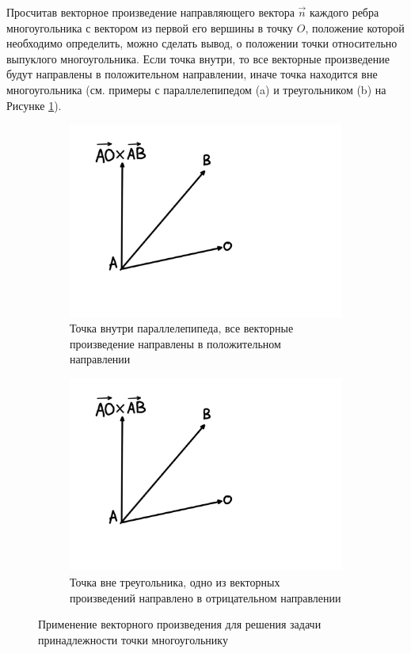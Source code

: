 Просчитав векторное произведение направляющего вектора $\vec{n}$ каждого ребра многоугольника с вектором из первой его вершины в точку $O$, положение которой необходимо определить, можно сделать вывод, о положении точки относительно выпуклого многоугольника. Если точка внутри, то все векторные произведение будут направлены в положительном направлении, иначе точка находится вне многоугольника (см. примеры с параллелепипедом (a) и треугольником (b) на Рисунке \ref{vec_method}).
\begin{figure}[H]
	\hfill
	\begin{subfigure}{.55\textwidth}
		\centering
		\includegraphics[width=\linewidth,page=3,trim={0cm 7cm 3cm 0cm}]{img/gm}
		\caption{Точка внутри параллелепипеда, все векторные произведение направлены в положительном направлении}
	\end{subfigure}
	\hfill
	\begin{subfigure}{.35\textwidth}
		\centering
		\includegraphics[width=\linewidth,page=4,trim={4cm 7cm 12cm 0cm}]{img/gm}
		\caption{Точка вне треугольника, одно из векторных произведений направлено в отрицательном направлении}
	\end{subfigure}
	\hfill
	\caption{Применение векторного произведения для решения задачи принадлежности точки многоугольнику}
	\label{vec_method}
\end{figure}

